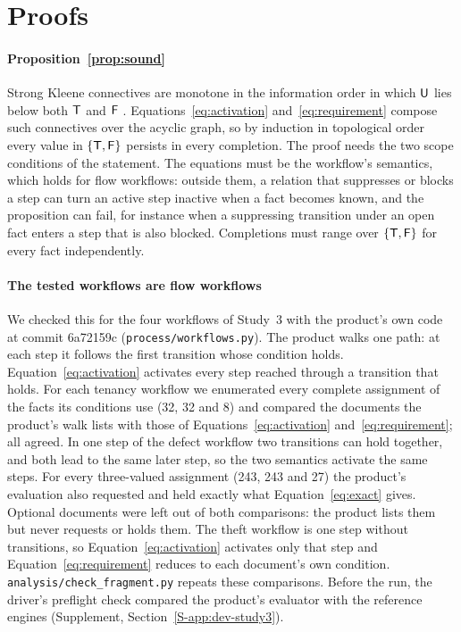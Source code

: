 \section{Proofs}
\label{app:proofs}

\paragraph{Proposition~\ref{prop:sound}}
Strong Kleene connectives are monotone in the information order in which $\mathsf{U}$ lies below both $\mathsf{T}$ and $\mathsf{F}$ \cite{kleene1952introduction}. Equations~\eqref{eq:activation} and~\eqref{eq:requirement} compose such connectives over the acyclic graph, so by induction in topological order every value in $\{\mathsf{T},\mathsf{F}\}$ persists in every completion. The proof needs the two scope conditions of the statement. The equations must be the workflow's semantics, which holds for flow workflows: outside them, a relation that suppresses or blocks a step can turn an active step inactive when a fact becomes known, and the proposition can fail, for instance when a suppressing transition under an open fact enters a step that is also blocked. Completions must range over $\{\mathsf{T},\mathsf{F}\}$ for every fact independently.

\paragraph{The tested workflows are flow workflows}
We checked this for the four workflows of Study~3 with the product's own code at commit 6a72159c (\texttt{process/\allowbreak{}workflows.py}). The product walks one path: at each step it follows the first transition whose condition holds. Equation~\eqref{eq:activation} activates every step reached through a transition that holds. For each tenancy workflow we enumerated every complete assignment of the facts its conditions use (32, 32 and 8) and compared the documents the product's walk lists with those of Equations~\eqref{eq:activation} and~\eqref{eq:requirement}; all agreed. In one step of the defect workflow two transitions can hold together, and both lead to the same later step, so the two semantics activate the same steps. For every three-valued assignment (243, 243 and 27) the product's evaluation also requested and held exactly what Equation~\eqref{eq:exact} gives. Optional documents were left out of both comparisons: the product lists them but never requests or holds them. The theft workflow is one step without transitions, so Equation~\eqref{eq:activation} activates only that step and Equation~\eqref{eq:requirement} reduces to each document's own condition. \texttt{analysis/\allowbreak{}check\_fragment.py} repeats these comparisons. Before the run, the driver's preflight check compared the product's evaluator with the reference engines (Supplement, Section~\ref{S-app:dev-study3}).

